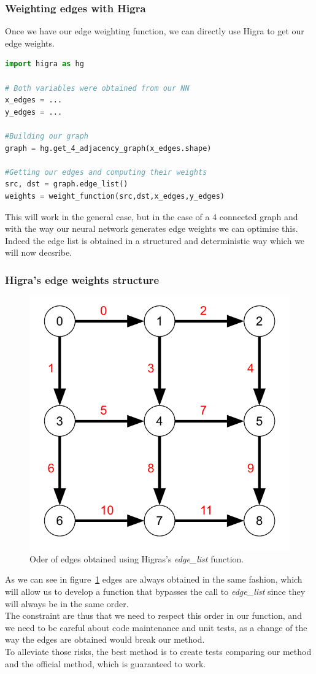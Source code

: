 \subsubsection{Weighting edges with Higra}

Once we have our edge weighting function, we can directly use Higra to get our
edge weights.
\begin{lstlisting}[language=Python]
import higra as hg

# Both variables were obtained from our NN
x_edges = ...
y_edges = ...

#Building our graph
graph = hg.get_4_adjacency_graph(x_edges.shape)

#Getting our edges and computing their weights
src, dst = graph.edge_list()
weights = weight_function(src,dst,x_edges,y_edges)
\end{lstlisting}

This will work in the general case, but in the case of a 4 connected graph and
with the way our neural network generates edge weights we can optimise this.
Indeed the edge list is obtained in a structured and deterministic way which
we will now decsribe.

\clearpage
\subsubsection{Higra's edge weights structure}

\begin{figure}[!htbp]
	\centering
	\includegraphics[width=0.5\linewidth]{./images/graph-order.pdf}
	\caption{Oder of edges obtained using Higras's \textit{edge\_list}
	function.}%
	\label{fig:graph_order}
\end{figure}

As we can see in figure~\ref{fig:graph_order} edges are always obtained in the
same fashion, which will allow us to develop a function that bypasses the call
to \textit{edge\_list} since they will always be in the same order.\\
The constraint are thus that we need to respect this order in our function, and
we need to be careful about code maintenance and unit tests, as a change of the
way the edges are obtained would break our method.\\
To alleviate those risks, the best method is to create tests comparing our
method and the official method, which is guaranteed to work.


